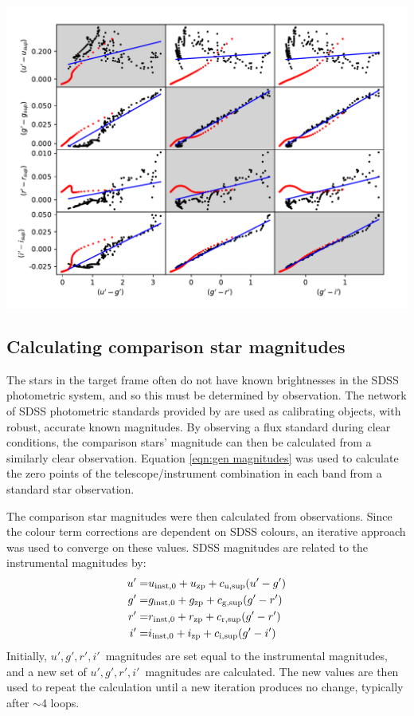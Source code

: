 \begin{minipage}{\linewidth}
    \includegraphics[width=\textwidth]{figures/observations/colour_term_tracks_HCAM.pdf}
    \label{fig:observations:HiPERCAM colour corrections}
\end{minipage}


\subsection{Calculating comparison star magnitudes}
\label{sect:comparison star mag calc}

The stars in the target frame often do not have known brightnesses in the SDSS photometric system, and so this must be determined by observation. The network of SDSS photometric standards provided by \citet{smith2002} are used as calibrating objects, with robust, accurate known magnitudes. By observing a flux standard during clear conditions, the comparison stars' magnitude can then be calculated from a similarly clear observation.
Equation \ref{eqn:gen magnitudes} was used to calculate the zero points of the telescope/instrument combination in each band from a standard star observation.

The comparison star magnitudes were then calculated from observations.
Since the colour term corrections are dependent on SDSS colours, an iterative approach was used to converge on these values.
SDSS magnitudes are related to the instrumental magnitudes by:
\begin{align*}
    u' =& u_{\rm inst,0} + u_{\rm zp} + c_{\rm u, sup}(u' - g') \\
    g' =& g_{\rm inst,0} + g_{\rm zp} + c_{\rm g, sup}(g' - r') \\
    r' =& r_{\rm inst,0} + r_{\rm zp} + c_{\rm r, sup}(g' - r') \\
    i' =& i_{\rm inst,0} + i_{\rm zp} + c_{\rm i, sup}(g' - i') \\
\end{align*}
Initially, $u',g',r',i'$\ magnitudes are set equal to the instrumental magnitudes, and a new set of $u',g',r',i'$\ magnitudes are calculated. The new values are then used to repeat the calculation until a new iteration produces no change, typically after $\sim$4 loops.


